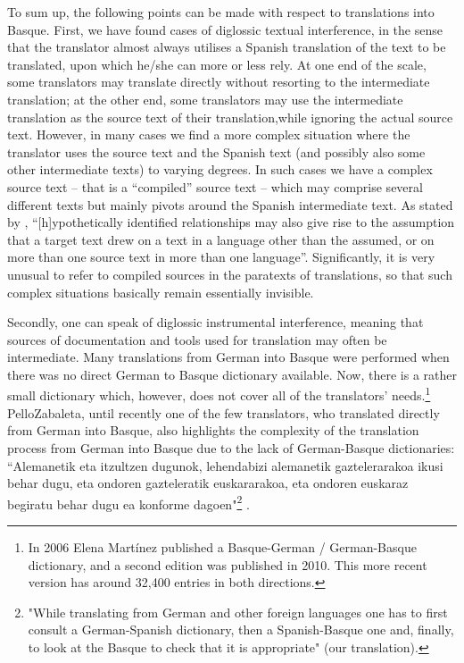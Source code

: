 \documentclass[output=paper]{LSP/langsci}
\begin{document}
To sum up, the following points can be made with respect to translations into Basque. First, we have found cases of diglossic textual interference, in the sense that the translator almost always utilises a Spanish translation of the text to be translated, upon which he/she can more or less rely. At one end of the scale, some translators may translate directly without resorting to the intermediate translation; at the other end, some translators may use the intermediate translation as the source text of their translation,while ignoring the actual source text. However, in many cases we find a more complex situation where the translator uses the source text and the Spanish text (and possibly also some other intermediate texts) to varying degrees. In such cases we have a complex source text – that is a “compiled” source text – which may comprise several different texts but mainly pivots around the Spanish intermediate text. As stated by \citep[72]{Toury1995}, “[h]ypothetically identified relationships may also give rise to the assumption that a target text drew on a text in a language other than the assumed, or on more than one source text in more than one language”. Significantly, it is very unusual to refer to compiled sources in the paratexts of translations, so that such complex situations basically remain essentially invisible.

Secondly, one can speak of diglossic instrumental interference, meaning that sources of documentation and tools used for translation may often be intermediate. Many translations from German into Basque were performed when there was no direct German to Basque dictionary available. Now, there is a rather small dictionary which, however, does not cover all of the translators’ needs.\footnote{In 2006 Elena Martínez published a Basque-German / German-Basque dictionary, and a second edition was published in 2010. This more recent version has around 32,400 entries in both directions.} PelloZabaleta, until recently one of the few translators, who translated directly from German into Basque, also highlights the complexity of the translation process from German into Basque due to the lack of German-Basque dictionaries: “Alemanetik eta itzultzen dugunok, lehendabizi alemanetik gaztelerarakoa ikusi behar dugu, eta ondoren gazteleratik euskararakoa, eta ondoren euskaraz begiratu behar dugu ea konforme dagoen"\footnote{"While translating from German and other foreign languages one has to first consult a German-Spanish dictionary, then a Spanish-Basque one and, finally, to look at the Basque to check that it is appropriate" (our translation).} \citep{Zabaleta1995}.
\end{document}
